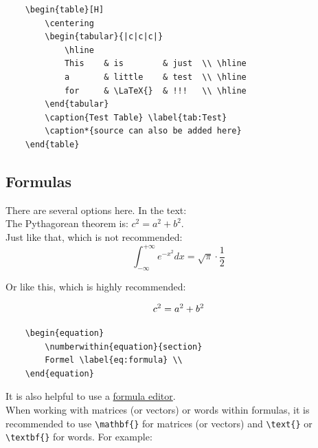 \begin{verbatim}
    \begin{table}[H]
        \centering
        \begin{tabular}{|c|c|c|}
            \hline
            This    & is        & just  \\ \hline
            a       & little    & test  \\ \hline
            for     & \LaTeX{}  & !!!   \\ \hline
        \end{tabular}
        \caption{Test Table} \label{tab:Test}
        \caption*{source can also be added here}
    \end{table}
\end{verbatim}


\subsection{Formulas}

There are several options here. In the text:\\
The Pythagorean theorem is: $c^2 = a^2 + b^2$. \\
Just like that, which is not recommended: \\
\[\label{eq:GaussianErrorIntegral}
\int_{-\infty}^{+\infty} e^{-x^2} dx = \sqrt{\pi} \cdot \frac{1}{2}
\]

Or like this, which is highly recommended:

\begin{equation}
	\numberwithin{equation}{section}
	c^2 = a^2 + b^2 \label{eq:Pythagoras} \\
\end{equation}

\begin{verbatim}
    \begin{equation}
        \numberwithin{equation}{section}
        Formel \label{eq:formula} \\
    \end{equation}
\end{verbatim}

It is also helpful to use a \href{https://www.codecogs.com/latex/eqneditor.php}{formula editor}.\\

When working with matrices (or vectors) or words within formulas, it is recommended to use \verb|\mathbf{}| for matrices (or vectors) and \verb|\text{}| or \verb|\textbf{}| for words. For example:

